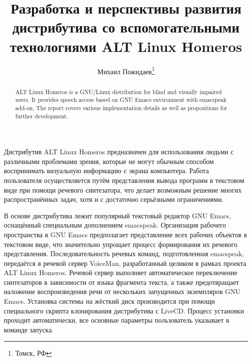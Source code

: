 \documentclass[10pt, a5paper]{article}
\begin{document}
\title{Разработка и перспективы развития дистрибутива со вспомогательными технологиями ALT Linux Homeros}%

\author{Михаил Пожидаев\footnote{Томск, РФ}}
\maketitle

\begin{abstract}
ALT Linux Homeros is a GNU/Linux distribution for blind and visually impaired users. It provides speech access based on GNU Emacs environment with emacspeak add-on. The report covers various implementation details as well as propositions for further development.
\end{abstract}

Дистрибутив ALT Linux Homeros предназначен для использования людьми с различными проблемами зрения, которые не могут обычным способом воспринимать визуальную информацию с экрана компьютера. Работа пользователя осуществляется путём представления вывода программ в текстовом виде при помощи речевого синтезатора, что делает возможным решение многих распространённых задач, хотя и с достаточно серьёзными ограничениями.

В основе дистрибутива лежит популярный текстовый редактор GNU Emacs, оснащённый специальным дополнением emacspeak. Организация рабочего пространства в GNU Emacs предполагает представление всех рабочих объектов в текстовом виде, что значительно упрощает процесс формирования их речевого представления. Последовательность речевых команд, подготовленная emacspeak, передаётся в речевой сервер VoiceMan, разработанный целиком в рамках проекта ALT Linux Homeros. Речевой сервер выполняет автоматическое переключение синтезаторов в зависимости от языка фрагмента текста, а также предотвращает наложение воспроизведения речи от нескольких запущенных экземпляров GNU Emacs. Установка системы на жёсткий диск производится при помощи специального скрипта клонирования дистрибутива с LiveCD. Процесс установки проходит автоматически, все основные параметры пользователь указывает в команде запуска.
\end{document}
